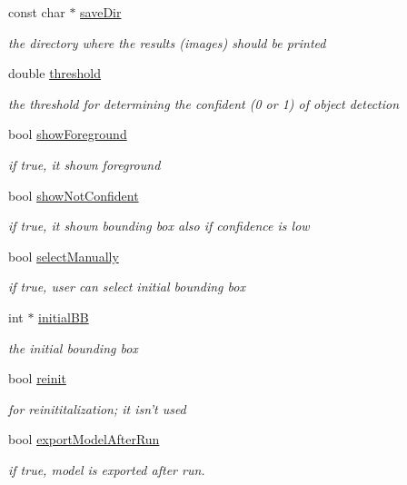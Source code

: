 \begin{DoxyCompactItemize}
const char $\ast$ \hyperlink{classMain_a4bc0c744bd9bb33aa9bbc92666819330}{save\-Dir}
\begin{DoxyCompactList}\small\item\em the directory where the results (images) should be printed \end{DoxyCompactList}\item 
double \hyperlink{classMain_a635e9bb74aaa1960aafcd75d21a8784f}{threshold}
\begin{DoxyCompactList}\small\item\em the threshold for determining the confident (0 or 1) of object detection \end{DoxyCompactList}\item 
bool \hyperlink{classMain_a9d083ec93a40eae468d5133fa7dc28ac}{show\-Foreground}
\begin{DoxyCompactList}\small\item\em if true, it shown foreground \end{DoxyCompactList}\item 
bool \hyperlink{classMain_abeddae348e1825fbbe33d41457954aeb}{show\-Not\-Confident}
\begin{DoxyCompactList}\small\item\em if true, it shown bounding box also if confidence is low \end{DoxyCompactList}\item 
bool \hyperlink{classMain_a4fbe69e8eb79528ea332fb35bd4e2575}{select\-Manually}
\begin{DoxyCompactList}\small\item\em if true, user can select initial bounding box \end{DoxyCompactList}\item 
int $\ast$ \hyperlink{classMain_a0f8b49ea51db0779192fb254c5e31e22}{initial\-B\-B}
\begin{DoxyCompactList}\small\item\em the initial bounding box \end{DoxyCompactList}\item 
bool \hyperlink{classMain_aedcd2167cc4b32d974742b745e51c8fb}{reinit}
\begin{DoxyCompactList}\small\item\em for reinititalization; it isn't used \end{DoxyCompactList}\item 
bool \hyperlink{classMain_a9a760d7b7e2dc8dc9bdaa027a86da734}{export\-Model\-After\-Run}
\begin{DoxyCompactList}\small\item\em if true, model is exported after run. \end{DoxyCompactList}\item 

\end{DoxyCompactItemize}
